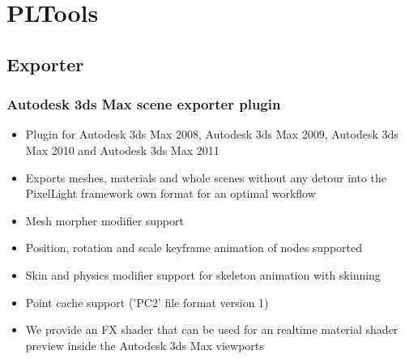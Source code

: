 \chapter{PLTools}




\section{Exporter}


\subsection{Autodesk 3ds Max scene exporter plugin}
\begin{itemize}
\item{Plugin for Autodesk 3ds Max 2008, Autodesk 3ds Max 2009, Autodesk 3ds Max 2010 and Autodesk 3ds Max 2011}
\item{Exports meshes, materials and whole scenes without any detour into the PixelLight framework own format for an optimal workflow}
\item{Mesh morpher modifier support}
\item{Position, rotation and scale keyframe animation of nodes supported}
\item{Skin and physics modifier support for skeleton animation with skinning}
\item{Point cache support ('PC2' file format version 1)}
\item{We provide an FX shader that can be used for an realtime material shader preview inside the Autodesk 3ds Max viewports}
\end{itemize}

